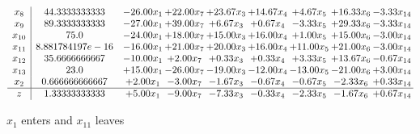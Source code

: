 \documentclass[9pt]{article}
\begin{document}
 \[\begin{array}{c| c c@{\hskip 2pt} c@{\hskip 2pt} c@{\hskip 2pt} c@{\hskip 2pt} c@{\hskip 2pt} c@{\hskip 2pt} c@{\hskip 2pt} }
 x_{8}   &  44.3333333333 & -26.00 x_{1} & + 22.00 x_{7} & + 23.67 x_{3} & + 14.67 x_{4} & +  4.67 x_{5} & + 16.33 x_{6} & -3.33 x_{14}\\
 x_{9}   &  89.3333333333 & -27.00 x_{1} & + 39.00 x_{7} & +  6.67 x_{3} & +  0.67 x_{4} & -3.33 x_{5} & + 29.33 x_{6} & -3.33 x_{14}\\
 x_{10}   &  75.0 & -24.00 x_{1} & + 18.00 x_{7} & + 15.00 x_{3} & + 16.00 x_{4} & +  1.00 x_{5} & + 15.00 x_{6} & -3.00 x_{14}\\
 x_{11}   &  8.881784197e-16 & -16.00 x_{1} & + 21.00 x_{7} & + 20.00 x_{3} & + 16.00 x_{4} & + 11.00 x_{5} & + 21.00 x_{6} & -3.00 x_{14}\\
 x_{12}   &  35.6666666667 & -10.00 x_{1} & +  2.00 x_{7} & +  0.33 x_{3} & +  0.33 x_{4} & +  3.33 x_{5} & + 13.67 x_{6} & -0.67 x_{14}\\
 x_{13}   &  23.0 & + 15.00 x_{1} & -26.00 x_{7} & -19.00 x_{3} & -12.00 x_{4} & -13.00 x_{5} & -21.00 x_{6} & +  3.00 x_{14}\\
 x_{2}   &  0.666666666667 & +  2.00 x_{1} & -3.00 x_{7} & -1.67 x_{3} & -0.67 x_{4} & -0.67 x_{5} & -2.33 x_{6} & +  0.33 x_{14}\\
\hline
z    &  1.33333333333 & +  5.00 x_{1} & -9.00 x_{7} & -7.33 x_{3} & -0.33 x_{4} & -2.33 x_{5} & -1.67 x_{6} & +  0.67 x_{14}\\
\end{array}\]


 $ x_{1} $ enters and $ x_{11} $ leaves 
\end{document}
